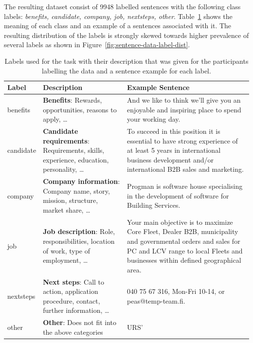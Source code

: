 The resulting dataset consist of 9948 labelled sentences with the following class labels: \emph{benefits, candidate, company, job, nextsteps, other}. Table~\ref{tab:Labels, Description, Example Sentences} shows the meaning of each class and an example of a sentences associated with it. The resulting distribution of the labels is strongly skewed towards higher prevalence of several labels as shown in Figure~\ref{fig:sentence-data-label-dist}.

\begin{table}[h]
  \begin{center}
  \begin{tabularx}{\textwidth}{l | X | X}
    \toprule
    Label & Description & Example Sentence \\
    \midrule
    benefits & \textbf{Benefits}: Rewards, opportunities, reasons to apply, \ldots & And we like to think we’ll give you an enjoyable and inspiring place to spend your working day. \\
    candidate & \textbf{Candidate requirements}: Requirements, skills, experience, education, personality, \ldots & To succeed in this position it is essential to have strong experience of at least 5 years in international business development and/or international B2B sales and marketing. \\
    company & \textbf{Company information}: Company name, story, mission, structure, market share, \ldots & Progman is software house specialising in the development of software for Building Services. \\
    job & \textbf{Job description}: Role, responsibilities, location of work, type of employment, \ldots & Your main objective is to maximize Core Fleet, Dealer B2B, municipality and governmental orders and sales for PC and LCV range to local Fleets and businesses within defined geographical area. \\
    nextsteps & \textbf{Next steps}: Call to action, application procedure, contact, further information, \ldots & 040 75 67 316, Mon-Fri 10-14, or peas@temp-team.fi. \\
    other & \textbf{Other}: Does not fit into the above categories & URS’ \\
    \bottomrule
  \end{tabularx}
  \caption{Labels used for the task with their description that was given for the participants labelling the data and a sentence example for each label.}
\label{tab:Labels, Description, Example Sentences}
\end{center}
\end{table}

